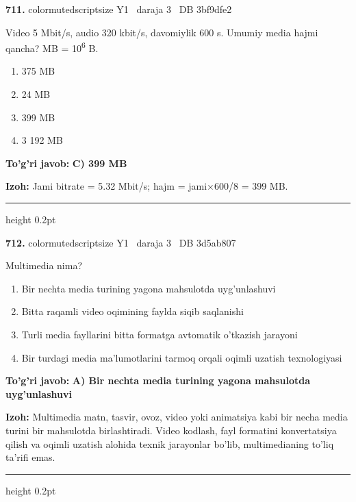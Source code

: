 \documentclass[10pt,a4paper,oneside]{article}
\begin{document}
\noindent\textbf{\color{ink}711.}  {color{muted}scriptsize Y1 \textbullet\ daraja 3 \textbullet\ DB 3bf9dfe2}
\par
Video 5 Mbit/s, audio 320 kbit/s, davomiylik 600 s. Umumiy media hajmi qancha? MB = 10\textsuperscript{6} B.
\begin{enumerate}[label=\Alph*),leftmargin=9mm]
\item 375 MB
\item 24 MB
\item 399 MB
\item 3 192 MB
\end{enumerate}
\begin{tcolorbox}[enhanced,breakable,colback=teal!4,colframe=teal!50!black,boxrule=0.5pt,arc=1.1mm,left=3mm,right=3mm,top=1.7mm,bottom=1.7mm,before skip=2mm,after skip=2mm]
\textbf{\color{teal}To'g'ri javob:} \textbf{C) 399 MB}
\par\smallskip
\textbf{Izoh:} Jami bitrate = 5.32 Mbit/s; hajm = jami\ensuremath{\times}600/8 = 399 MB.
\end{tcolorbox}
\vspace{2mm}\hrule height 0.2pt \vspace{3mm}

\noindent\textbf{\color{ink}712.}  {color{muted}scriptsize Y1 \textbullet\ daraja 3 \textbullet\ DB 3d5ab807}
\par
Multimedia nima?
\begin{enumerate}[label=\Alph*),leftmargin=9mm]
\item Bir nechta media turining yagona mahsulotda uyg'unlashuvi
\item Bitta raqamli video oqimining faylda siqib saqlanishi
\item Turli media fayllarini bitta formatga avtomatik o'tkazish jarayoni
\item Bir turdagi media ma'lumotlarini tarmoq orqali oqimli uzatish texnologiyasi
\end{enumerate}
\begin{tcolorbox}[enhanced,breakable,colback=teal!4,colframe=teal!50!black,boxrule=0.5pt,arc=1.1mm,left=3mm,right=3mm,top=1.7mm,bottom=1.7mm,before skip=2mm,after skip=2mm]
\textbf{\color{teal}To'g'ri javob:} \textbf{A) Bir nechta media turining yagona mahsulotda uyg'unlashuvi}
\par\smallskip
\textbf{Izoh:} Multimedia matn, tasvir, ovoz, video yoki animatsiya kabi bir necha media turini bir mahsulotda birlashtiradi. Video kodlash, fayl formatini konvertatsiya qilish va oqimli uzatish alohida texnik jarayonlar bo'lib, multimedianing to'liq ta'rifi emas.
\end{tcolorbox}
\vspace{2mm}\hrule height 0.2pt \vspace{3mm}
\end{document}
